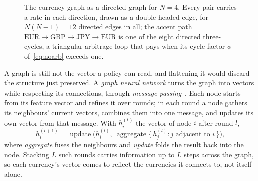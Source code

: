 \documentclass[12pt,a4paper]{article}
\begin{document}
\begin{figure}[t]
\centering
{}
\caption{The currency graph as a directed graph for $N=4$. Every pair carries a rate in each
direction, drawn as a double-headed edge, for $N(N-1)=12$ directed edges in all; the accent path
$\text{EUR}\!\to\!\text{GBP}\!\to\!\text{JPY}\!\to\!\text{EUR}$ is one of the eight directed
three-cycles, a triangular-arbitrage loop that pays when its cycle factor $\phi$
of~\eqref{eq:noarb} exceeds one.}
\label{fig:graph}
\end{figure}

A graph is still not the vector a policy can read, and flattening it would discard the structure
just preserved. A \emph{graph neural network} turns the graph into vectors while respecting its
connections, through \emph{message passing}~\citep{gilmer2017mpnn,battaglia2018relational}. Each
node starts from its feature vector and refines it over rounds; in each round a node gathers its
neighbours' current vectors, combines them into one message, and updates its own vector from that
message. With $h_i^{(l)}$ the vector of node $i$ after round $l$,
\begin{equation}
h_i^{(l+1)}=\operatorname{update}\!\Big(h_i^{(l)},\ \operatorname{aggregate}\big\{\,h_j^{(l)}:j\text{ adjacent to }i\,\big\}\Big),
\end{equation}
where \emph{aggregate} fuses the neighbours and \emph{update} folds the result back into the
node. Stacking $L$ such rounds carries information up to $L$ steps across the graph, so each
currency's vector comes to reflect the currencies it connects to, not itself alone.
\end{document}
